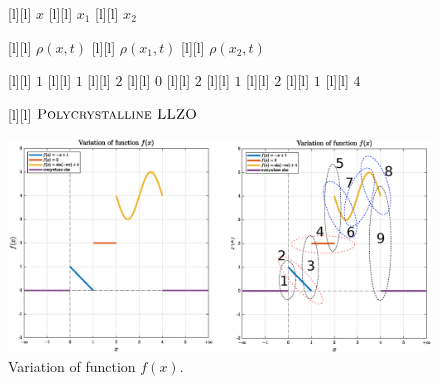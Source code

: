 \begin{figure}[ht]
	\centering
	\footnotesize

	[l] {$x$}
	[l] {$x_1$}
	[l] {$x_2$}

	[l] {$\rho(x,t)$}
	[l] {$\rho(x_{1},t)$}
	[l] {$\rho(x_{2},t)$}

	[l] {$1$}
	[l] {$1$}
	[l] {$2$}
	[l] {$0$}
	[l] {$2$}
	[l] {$1$}
	[l] {$2$}
	[l] {$1$}
	[l] {$4$}

	[l] {$\textsc{Polycrystalline LLZO}$}

	\includegraphics[width=1\textwidth]{totalvariation_sin.eps}
	\caption{Variation of function $f(x)$.}
	\label{\LABEL}
\end{figure}
